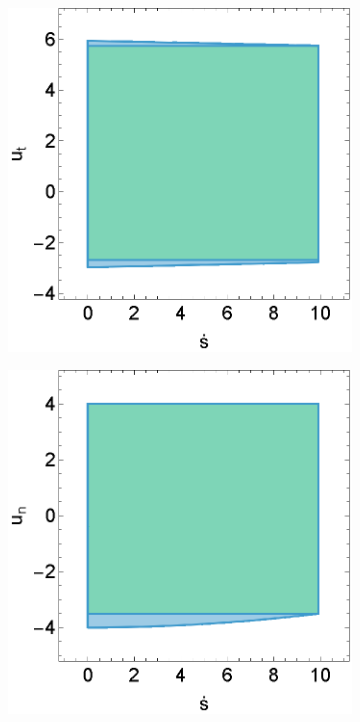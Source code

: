 \begin{figure}[h]
	\centering
	\begin{subfigure}[b]{0.32\textwidth}
		\centering
		\includegraphics[width=\textwidth]{figures/inner_polytope/region_x3u1_plot_gr1.eps}
	\end{subfigure}
	\begin{subfigure}[b]{0.32\textwidth}
		\centering
		\includegraphics[width=\textwidth]{figures/inner_polytope/region_x3u2_plot_gr1.eps}

\end{subfigure}
\end{figure}
